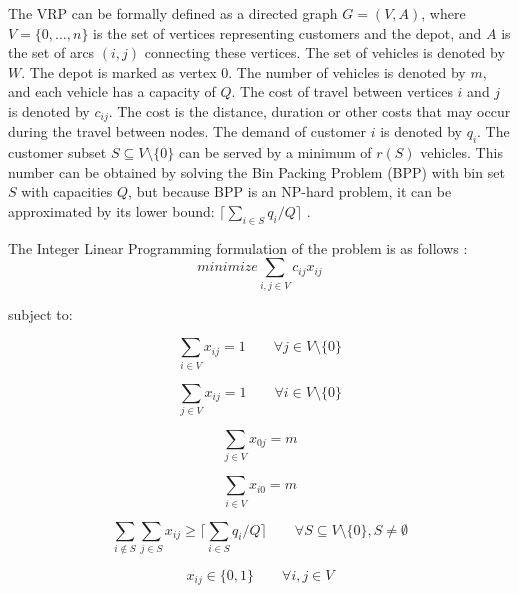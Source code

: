 \documentclass[a4paper,twoside,12pt]{book}
\begin{document}
The VRP can be formally defined as a directed graph $G = (V, A)$, where $V = \lbrace0, \ldots, n\rbrace$ is the set of vertices representing customers and the depot, and $A$ is the set of arcs $(i, j)$ connecting these vertices. The set of vehicles is denoted by $W$. The depot is marked as vertex 0. The number of vehicles is denoted by $m$, and each vehicle has a capacity of $Q$. The cost of travel between vertices $i$ and $j$ is denoted by $c_{ij}$. The cost is the distance, duration or other costs that may occur during the travel between nodes. The demand of customer $i$ is denoted by $q_{i}$.
The customer subset $S \subseteq V\setminus \lbrace0\rbrace$ can be served by a minimum of $r(S)$ vehicles. This number can be obtained by solving the Bin Packing Problem (BPP) with bin set $S$ with capacities $Q$, but because BPP is an NP-hard problem, it can be approximated by its lower bound: $\lceil \sum_{i \in S} q_{i}/Q \rceil$ \cite{bib:article:CordeauVehicleRouting}.

The Integer Linear Programming formulation of the problem is as follows \cite{bib:book:TothAndVigo}:
\begin{equation}
minimize \sum_{i,j \in V} c_{ij}x_{ij}
\end{equation}

subject to:

\begin{equation}
\sum_{i \in V}x_{ij} = 1 \qquad \forall j \in V \setminus \lbrace 0 \rbrace
\end{equation}

\begin{equation}
\sum_{j \in V}x_{ij} = 1 \qquad \forall i \in V \setminus \lbrace 0 \rbrace
\end{equation}

\begin{equation}
\sum_{j \in V}x_{0j} = m 
\end{equation}

\begin{equation}
\sum_{i \in V}x_{i0} = m 
\end{equation}

\begin{equation}
\sum_{i \not\in S} \sum_{j \in S}x_{ij} \geq \lceil \sum_{i \in S} q_{i} / Q \rceil \qquad \forall S \subseteq V \setminus \lbrace 0 \rbrace , S \neq \emptyset
\end{equation}

\begin{equation}
x_{ij} \in \lbrace 0,1 \rbrace \qquad \forall i,j \in V
\end{equation}
\end{document}

